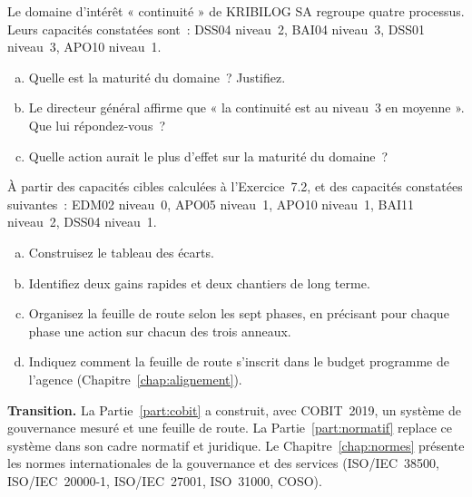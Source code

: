 \begin{boxexo}[title={\ding{45}\quad Exercice~8.2. La maturité de la continuité \niveaumoyen}]
Le domaine d'intérêt « continuité » de KRIBILOG SA regroupe quatre
processus. Leurs capacités constatées sont~: DSS04 niveau~2, BAI04
niveau~3, DSS01 niveau~3, APO10 niveau~1.
\begin{enumerate}[(a)]
    \item Quelle est la maturité du domaine~? Justifiez.
    \item Le directeur général affirme que « la continuité est au niveau~3
          en moyenne ». Que lui répondez-vous~?
    \item Quelle action aurait le plus d'effet sur la maturité du domaine~?
\end{enumerate}
\end{boxexo}

\begin{boxexo}[title={\ding{45}\quad Exercice~8.3. La feuille de route de l'ANPP \niveauexpert}]
À partir des capacités cibles calculées à l'Exercice~7.2, et des capacités
constatées suivantes~: EDM02 niveau~0, APO05 niveau~1, APO10 niveau~1,
BAI11 niveau~2, DSS04 niveau~1.
\begin{enumerate}[(a)]
    \item Construisez le tableau des écarts.
    \item Identifiez deux gains rapides et deux chantiers de long terme.
    \item Organisez la feuille de route selon les sept phases, en précisant
          pour chaque phase une action sur chacun des trois anneaux.
    \item Indiquez comment la feuille de route s'inscrit dans le budget
          programme de l'agence (Chapitre~\ref{chap:alignement}).
\end{enumerate}
\end{boxexo}

\bigskip

\begin{boxinfo}
\textbf{Transition.} La Partie~\ref{part:cobit} a construit, avec COBIT~2019,
un système de gouvernance mesuré et une feuille de route. La
Partie~\ref{part:normatif} replace ce système dans son cadre normatif et
juridique. Le Chapitre~\ref{chap:normes} présente les normes
internationales de la gouvernance et des services (ISO/IEC~38500,
ISO/IEC~20000-1, ISO/IEC~27001, ISO~31000, COSO).
\end{boxinfo}

